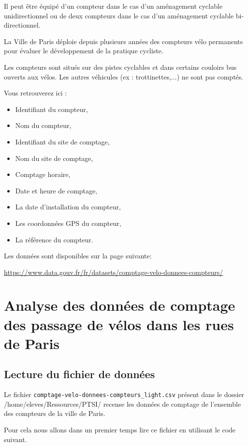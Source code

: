 Il peut être équipé d'un compteur dans le cas d'un aménagement cyclable unidirectionnel ou de deux compteurs dans le cas d'un aménagement cyclable bi-directionnel.

La Ville de Paris déploie depuis plusieurs années des compteurs vélo permanents pour évaluer le développement de la pratique cycliste.

Les compteurs sont situés sur des pistes cyclables et dans certains couloirs bus ouverts aux vélos. Les autres véhicules (ex : trottinettes,...) ne sont pas comptés.

Vous retrouverez ici :
\begin{itemize}
 \item Identifiant du compteur,
 \item Nom du compteur,
 \item Identifiant du site de comptage,
 \item Nom du site de comptage,
 \item Comptage horaire,
 \item Date et heure de comptage,
 \item La date d'installation du compteur,
 \item Les coordonnées GPS du compteur,
 \item La référence du compteur.
\end{itemize}    

Les données sont disponibles sur la page suivante:
\begin{center}
\url{https://www.data.gouv.fr/fr/datasets/comptage-velo-donnees-compteurs/}
\end{center}

\section{Analyse des données de comptage des passage de vélos dans les rues de Paris}

\subsection{Lecture du fichier de données}

Le fichier \verb?comptage-velo-donnees-compteurs_light.csv? présent dans le dossier \og /home/eleves/Ressources/PTSI/ \fg recense les données de comptage de l'ensemble des compteurs de la ville de Paris. 	

Pour cela nous allons dans un premier temps lire ce fichier en utilisant le code suivant.


